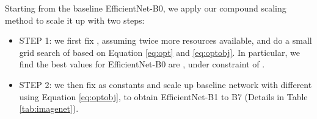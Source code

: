 \documentclass{article}
\begin{document}
\begin{table}
	\vskip -0.1in     
	\caption{	--  Each row describes a stage  with  layers, with input resolution  and output channels . Notations are adopted from equation \ref{eq:opt}.
	}
  \vskip 0.05in
  \centering   

              
  \label{tab:efficientnetb0}      
\end{table}                     

Starting from the baseline EfficientNet-B0, we apply our compound scaling method to scale it up with two steps:

\begin{itemize}
	\setlength\itemsep{0em}
	\item STEP 1: we first fix , assuming twice more resources available, and do a small grid search of  based on Equation \ref{eq:opt} and \ref{eq:optobj}. In particular, we find the best values for EfficientNet-B0 are , under constraint of . 
	\item STEP 2: we then fix  as constants and scale up baseline network with different  using Equation \ref{eq:optobj}, to obtain EfficientNet-B1 to B7 (Details in Table \ref{tab:imagenet}).
\end{itemize}
\end{document}
